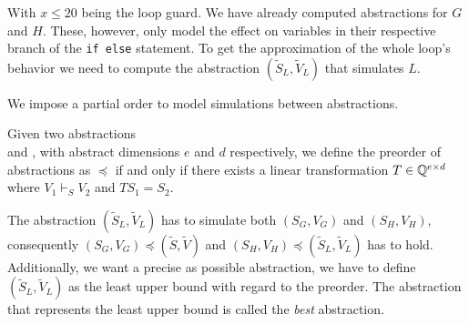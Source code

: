 With $x \leq 20$ being the loop guard. We have already computed \qvasr abstractions for $G$ and $H$. These, however, only model the effect on variables in their respective branch of the \texttt{if else} statement. To get the approximation of the whole loop's behavior we need to compute the \qvasr abstraction $(\tilde{S}_L, \tilde{V}_L)$ that simulates $L$. \\ \par We impose a partial order to model simulations between \qvasr abstractions.
\begin{mydef}
	Given two \qvasr abstractions \\  and , with abstract dimensions $e$ and $d$ respectively, we define the preorder of \qvasr abstractions as  $\preceq$  if and only if there exists a linear transformation $T \in  \mathbb{Q} ^{e \times d}$ where $V_1 \vdash_S V_2$ and $TS_1 = S_2$.
\end{mydef}
The \qvasr abstraction $(\tilde{S}_L, \tilde{V}_L)$ has to simulate both $(S_G, V_G)$ and $(S_H, V_H)$, consequently $(S_G, V_G) \preceq (\tilde{S}, \tilde{V})$ and $(S_H, V_H) \preceq (\tilde{S}_L, \tilde{V}_L)$ has to hold. Additionally, we want a precise as possible \qvasr abstraction, we have to define $(\tilde{S}_L, \tilde{V}_L)$ as the least upper bound with regard to the preorder. The \qvasr abstraction that represents the least upper bound is called the \textsl{best} \qvasr abstraction. \par

